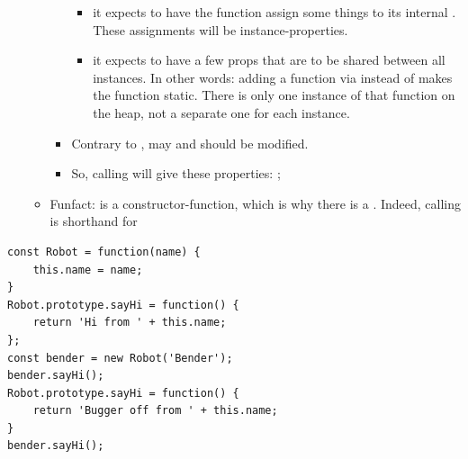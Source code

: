\begin{itemize}
\begin{itemize}
\begin{itemize}
                        \begin{itemize}
                            \item it expects to have the function assign some things to its internal . These assignments will be instance-properties.
                            \item it expects  to have a few props that are to be shared between all instances. In other words: adding a function via  instead of  makes the function static. There is only one instance of that function on the heap, not a separate one for each instance.
                        \end{itemize}
                    \item Contrary to ,  may and should be modified.
                    \item So, calling  will give  these properties: ;
                \end{itemize}
            \item Funfact:  is a constructor-function, which is why there is a . Indeed, calling  is shorthand for  
        \end{itemize}
\end{itemize}

\begin{lstlisting}
const Robot = function(name) {
    this.name = name;
}
Robot.prototype.sayHi = function() {
    return 'Hi from ' + this.name;
};
const bender = new Robot('Bender');
bender.sayHi();
Robot.prototype.sayHi = function() {
    return 'Bugger off from ' + this.name;
}
bender.sayHi();
\end{lstlisting}

